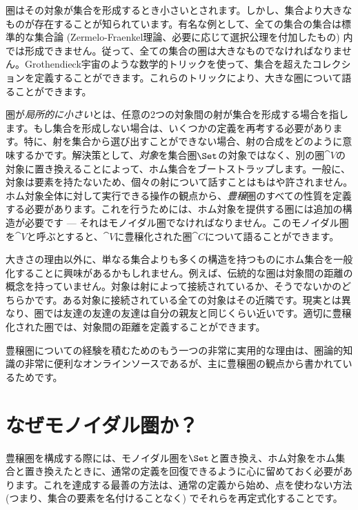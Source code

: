 
\lettrine[lhang=0.17]{圏}{は}その対象が集合を形成するとき小さいとされます。しかし、集合より大きなものが存在することが知られています。有名な例として、全ての集合の集合は標準的な集合論 (Zermelo-Fraenkel理論、必要に応じて選択公理を付加したもの) 内では形成できません。従って、全ての集合の圏は大きなものでなければなりません。Grothendieck宇宙のような数学的トリックを使って、集合を超えたコレクションを定義することができます。これらのトリックにより、大きな圏について語ることができます。

圏が\emph{局所的に小さい}とは、任意の2つの対象間の射が集合を形成する場合を指します。もし集合を形成しない場合は、いくつかの定義を再考する必要があります。特に、射を集合から選び出すことができない場合、射の合成をどのように意味するかです。解決策として、\emph{対象}を集合圏$\Set$の対象ではなく、別の圏$\cat{V}$の対象に置き換えることによって、ホム集合をブートストラップします。一般に、対象は要素を持たないため、個々の射について話すことはもはや許されません。ホム対象全体に対して実行できる操作の観点から、\emph{豊穣}圏のすべての性質を定義する必要があります。これを行うためには、ホム対象を提供する圏には追加の構造が必要です --- それはモノイダル圏でなければなりません。このモノイダル圏を$\cat{V}$と呼ぶとすると、$\cat{V}$に豊穣化された圏$\cat{C}$について語ることができます。

大きさの理由以外に、単なる集合よりも多くの構造を持つものにホム集合を一般化することに興味があるかもしれません。例えば、伝統的な圏は対象間の距離の概念を持っていません。対象は射によって接続されているか、そうでないかのどちらかです。ある対象に接続されている全ての対象はその近隣です。現実とは異なり、圏では友達の友達の友達は自分の親友と同じくらい近いです。適切に豊穣化された圏では、対象間の距離を定義することができます。

豊穣圏についての経験を積むためのもう一つの非常に実用的な理由は、圏論的知識の非常に便利なオンラインソースであるが、主に豊穣圏の観点から書かれているためです。

\section{なぜモノイダル圏か？}

豊穣圏を構成する際には、モノイダル圏を$\Set$と置き換え、ホム対象をホム集合と置き換えたときに、通常の定義を回復できるように心に留めておく必要があります。これを達成する最善の方法は、通常の定義から始め、点を使わない方法 (つまり、集合の要素を名付けることなく) でそれらを再定式化することです。

